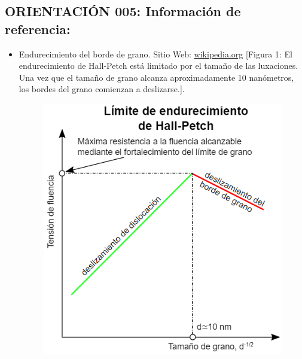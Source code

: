 \documentclass[12pt,a4paper]{article}
\begin{document}
    \subsection{ORIENTACIÓN 005: Información de referencia:}
    \begin{itemize}
        \item Endurecimiento del borde de grano.  Sitio Web: \href{https://es.wikipedia.org/wiki/Endurecimiento_del_borde_de_grano}{wikipedia.org} [Figura 1: El endurecimiento de Hall-Petch está limitado por el tamaño de las luxaciones. Una vez que el tamaño de grano alcanza aproximadamente 10 nanómetros, los bordes del grano comienzan a deslizarse.].
        \begin{figure}[h]
            \centering
            \includegraphics[width=0.5\linewidth]{figuras/imagen 3.png}
            \label{fig:enter-label}
        \end{figure}
    \end{itemize}

\section{}
\end{document}
